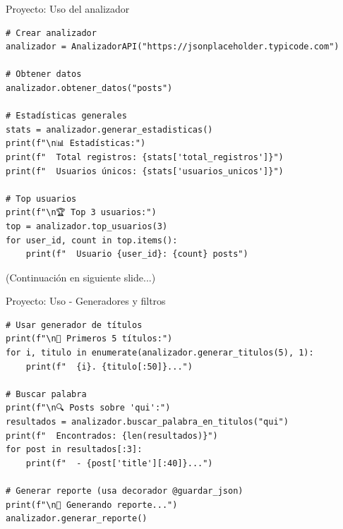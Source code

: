 \documentclass{beamer}
\begin{document}
\begin{frame}[fragile]{Proyecto: Uso del analizador \faTerminal}
\begin{lstlisting}
# Crear analizador
analizador = AnalizadorAPI("https://jsonplaceholder.typicode.com")

# Obtener datos
analizador.obtener_datos("posts")

# Estadísticas generales
stats = analizador.generar_estadisticas()
print(f"\n📊 Estadísticas:")
print(f"  Total registros: {stats['total_registros']}")
print(f"  Usuarios únicos: {stats['usuarios_unicos']}")

# Top usuarios
print(f"\n🏆 Top 3 usuarios:")
top = analizador.top_usuarios(3)
for user_id, count in top.items():
    print(f"  Usuario {user_id}: {count} posts")
\end{lstlisting}

\small(Continuación en siguiente slide...)
\end{frame}

\begin{frame}[fragile]{Proyecto: Uso - Generadores y filtros \faPlay}
\begin{lstlisting}
# Usar generador de títulos
print(f"\n📝 Primeros 5 títulos:")
for i, titulo in enumerate(analizador.generar_titulos(5), 1):
    print(f"  {i}. {titulo[:50]}...")

# Buscar palabra
print(f"\n🔍 Posts sobre 'qui':")
resultados = analizador.buscar_palabra_en_titulos("qui")
print(f"  Encontrados: {len(resultados)}")
for post in resultados[:3]:
    print(f"  - {post['title'][:40]}...")

# Generar reporte (usa decorador @guardar_json)
print(f"\n📄 Generando reporte...")
analizador.generar_reporte()
\end{lstlisting}
\end{frame}
\end{document}
